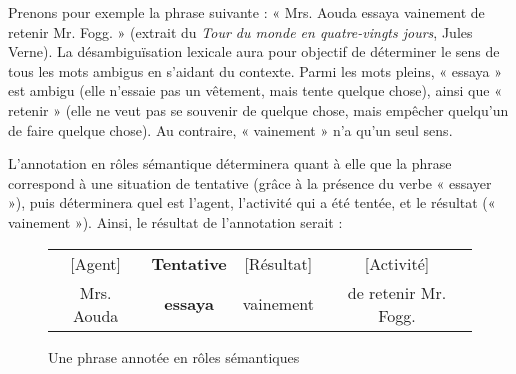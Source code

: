 Prenons pour exemple la phrase suivante : « Mrs. Aouda essaya vainement de
retenir Mr. Fogg. » (extrait du \textit{Tour du monde en quatre-vingts jours},
Jules Verne). La désambiguïsation lexicale aura pour objectif de déterminer le
sens de tous les mots ambigus en s'aidant du contexte. Parmi les mots pleins, «
essaya » est ambigu (elle n'essaie pas un vêtement, mais tente quelque chose),
ainsi que « retenir » (elle ne veut pas se souvenir de quelque chose, mais
empêcher quelqu'un de faire quelque chose). Au contraire, « vainement » n'a
qu'un seul sens.

L'annotation en rôles sémantique déterminera quant à elle que la phrase
correspond à une situation de tentative (grâce à la présence du verbe « essayer
»), puis déterminera quel est l'agent, l'activité qui a été tentée, et le
résultat (« vainement »). Ainsi, le résultat de l'annotation serait :

\begin{figure}[htbl]
    \centering
    \begin{tabular}{cccc}
      [Agent]  & \textbf{Tentative} & [Résultat]  & [Activité]           \tabularnewline
    Mrs. Aouda & \textbf{essaya}  & vainement  & de retenir Mr. Fogg. \tabularnewline
    \end{tabular}
    \caption{Une phrase annotée en rôles sémantiques}
\end{figure}

%
%

